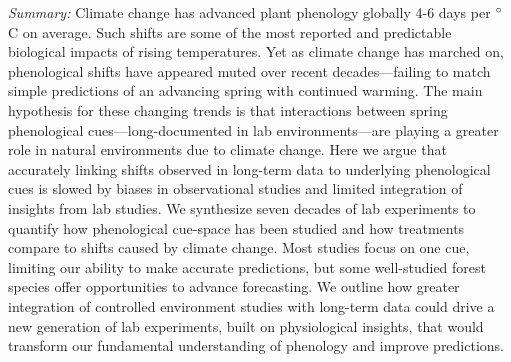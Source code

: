 \documentclass[11pt,letter]{article}
\begin{document}
\newpage
\emph{Summary:} 
Climate change has advanced plant phenology globally 4-6 days per $\degree$C on average. Such shifts are some of the most reported and predictable biological impacts of rising temperatures. Yet as climate change has marched on, phenological shifts have appeared muted over recent decades---failing to match simple predictions of an advancing spring with continued warming. The main hypothesis for these changing trends is that interactions between spring phenological cues---long-documented in lab environments---are playing a greater role in natural environments due to climate change. Here we argue that accurately linking shifts observed in long-term data to underlying phenological cues is slowed by biases in observational studies and limited integration of  insights from lab studies. We synthesize seven decades of lab experiments to quantify how phenological cue-space has been studied and how treatments compare to shifts caused by climate change. Most studies focus on one cue, limiting our ability to make accurate predictions, but some well-studied forest species offer opportunities to advance forecasting. We outline how greater integration of controlled environment studies with long-term data could drive a new generation of lab experiments, built on physiological insights, that would transform our fundamental understanding of phenology and improve predictions. \\ %
\end{document}
